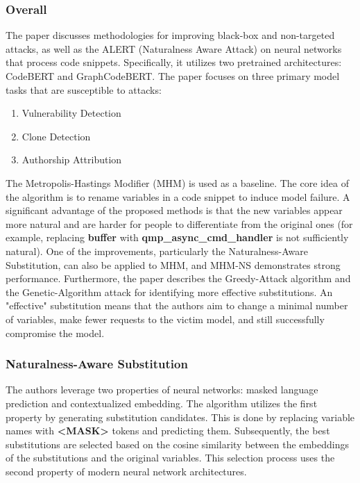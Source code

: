 \documentclass[12pt,letterpaper]{article}
\begin{document}
\subsubsection*{Overall}
The paper discusses methodologies for improving black-box and non-targeted attacks, as well as the ALERT (Naturalness Aware Attack) on neural networks that process code snippets. Specifically, it utilizes two pretrained architectures: CodeBERT and GraphCodeBERT. The paper focuses on three primary model tasks that are susceptible to attacks:
\begin{enumerate}
  \item  Vulnerability Detection
  \item  Clone Detection
  \item Authorship Attribution
\end{enumerate}
The Metropolis-Hastings Modifier (MHM) is used as a baseline. The core idea of the algorithm is to rename variables in a code snippet to induce model failure. A significant advantage of the proposed methods is that the new variables appear more natural and are harder for people to differentiate from the original ones (for example, replacing \textbf{buffer} with \textbf{qmp\_async\_cmd\_handler} is not sufficiently natural). One of the improvements, particularly the Naturalness-Aware Substitution, can also be applied to MHM, and MHM-NS demonstrates strong performance. Furthermore, the paper describes the Greedy-Attack algorithm and the Genetic-Algorithm attack for identifying more effective substitutions. An "effective" substitution means that the authors aim to change a minimal number of variables, make fewer requests to the victim model, and still successfully compromise the model.

\subsubsection*{Naturalness-Aware Substitution}
The authors leverage two properties of neural networks: masked language prediction and contextualized embedding. The algorithm utilizes the first property by generating substitution candidates. This is done by replacing variable names with \textbf{\textless MASK\textgreater} tokens and predicting them. Subsequently, the best substitutions are selected based on the cosine similarity between the embeddings of the substitutions and the original variables. This selection process uses the second property of modern neural network architectures.
\end{document}
